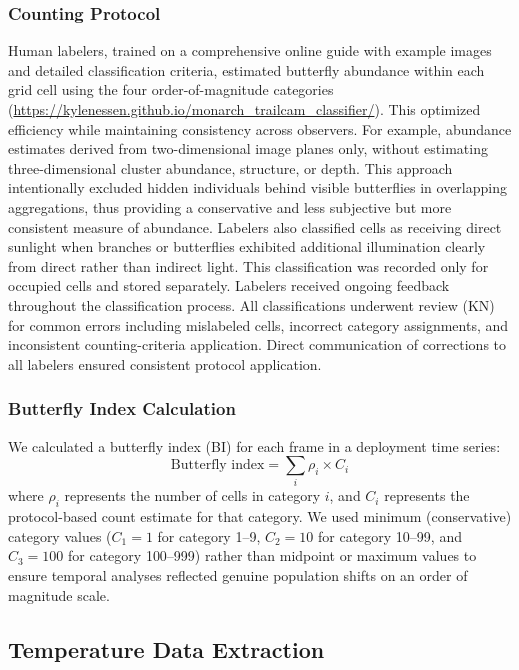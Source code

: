 \documentclass[insects,article,submit,pdftex,moreauthors]{Definitions/mdpi}
\begin{document}
\subsubsection{Counting Protocol}

Human labelers, trained on a comprehensive online guide with example images and detailed classification criteria, estimated butterfly abundance within each grid cell using the four order-of-magnitude categories (\url{https://kylenessen.github.io/monarch_trailcam_classifier/}). This optimized efficiency while maintaining consistency across observers. For example, abundance estimates derived from two-dimensional image planes only, without estimating three-dimensional cluster abundance, structure, or depth. This approach intentionally excluded hidden individuals behind visible butterflies in overlapping aggregations, thus providing a conservative and less subjective but more consistent measure of abundance. Labelers also classified cells as receiving direct sunlight when branches or butterflies exhibited additional illumination clearly from direct rather than indirect light. This classification was recorded only for occupied cells and stored separately. Labelers received ongoing feedback throughout the classification process. All classifications underwent review (KN) for common errors including mislabeled cells, incorrect category assignments, and inconsistent counting-criteria application. Direct communication of corrections to all labelers ensured consistent protocol application.

\subsubsection{Butterfly Index Calculation}

We calculated a butterfly index (BI) for each frame in a deployment time series:
\begin{equation}
\text{Butterfly index} = \sum_{i} \rho_{i} \times C_{i}
\end{equation}
where $\rho_{i}$ represents the number of cells in category $i$, and $C_{i}$ represents the protocol-based count estimate for that category. We used minimum (conservative) category values ($C_{1} = 1$ for category 1--9, $C_{2} = 10$ for category 10--99, and $C_{3} = 100$ for category 100--999) rather than midpoint or maximum values to ensure temporal analyses reflected genuine population shifts on an order of magnitude scale.

\subsection{Temperature Data Extraction}
\end{document}
